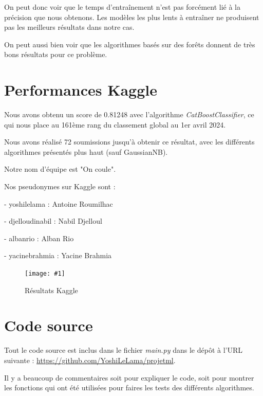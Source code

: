 \documentclass[a4paper]{article}
\newcommand{\illustration}[3]{
    \begin{figure}[h!]
        \centering
        \texttt{[image: \#1]}
        \caption{#2}
    \end{figure}
}
\begin{document}
    On peut donc voir que le temps d'entraînement n'est pas forcément lié à la précision que nous obtenons.
    Les modèles les plus lents à entraîner ne produisent pas les meilleurs résultats dans notre cas.

    On peut aussi bien voir que les algorithmes basés sur des forêts donnent de très bons résultats pour ce
    problème.

    \newpage

    \section{Performances Kaggle}

    Nous avons obtenu un score de 0.81248 avec l'algorithme {\it CatBoostClassifier}, ce qui nous place au 161ème rang du classement global au 1er avril 2024.

    Nous avons réalisé 72 soumissions jusqu'à obtenir ce résultat, avec les différents algorithmes présentés plus haut (sauf GaussianNB).

    Notre nom d'équipe est "On coule".

    Nos pseudonymes sur Kaggle sont :

    - yoshilelama : Antoine Roumilhac
    
    - djelloudinabil : Nabil Djelloul

    - albanrio : Alban Rio

    - yacinebrahmia : Yacine Brahmia

    \illustration{images/kaggle.png}{Résultats Kaggle}{\textwidth}

    \section{Code source}

    Tout le code source est inclus dans le fichier {\it main.py} dans le dépôt à l'URL suivante : 
    \href{https://github.com/YoshiLeLama/projetml}{https://github.com/YoshiLeLama/projetml}.

    Il y a beaucoup de commentaires soit pour expliquer le code, soit pour montrer les 
    fonctions qui ont été utilisées pour faires les tests des différents algorithmes.
\end{document}
